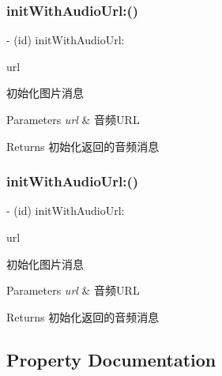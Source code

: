 \subsubsection{\texorpdfstring{init\+With\+Audio\+Url\+:()}{initWithAudioUrl:()}\hspace{0.1cm}{\footnotesize\ttfamily [1/2]}}
{\footnotesize\ttfamily -\/ (id) init\+With\+Audio\+Url\+: \begin{DoxyParamCaption}\item[{(N\+S\+String $\ast$)}]{url }\end{DoxyParamCaption}}

初始化图片消息 
\begin{DoxyParams}{Parameters}
{\em url} & 音频\+U\+RL \\
\hline
\end{DoxyParams}
\begin{DoxyReturn}{Returns}
初始化返回的音频消息 
\end{DoxyReturn}
\mbox{\label{interface_tencent_audio_message_obj_v1_ac106008b2a775e6cffe3e4f780ca300b}} 
\subsubsection{\texorpdfstring{init\+With\+Audio\+Url\+:()}{initWithAudioUrl:()}\hspace{0.1cm}{\footnotesize\ttfamily [2/2]}}
{\footnotesize\ttfamily -\/ (id) init\+With\+Audio\+Url\+: \begin{DoxyParamCaption}\item[{(N\+S\+String $\ast$)}]{url }\end{DoxyParamCaption}}

初始化图片消息 
\begin{DoxyParams}{Parameters}
{\em url} & 音频\+U\+RL \\
\hline
\end{DoxyParams}
\begin{DoxyReturn}{Returns}
初始化返回的音频消息 
\end{DoxyReturn}


\subsection{Property Documentation}
\mbox{\label{interface_tencent_audio_message_obj_v1_a9b064a8a301e9f72aa43902fe8238652}} 
